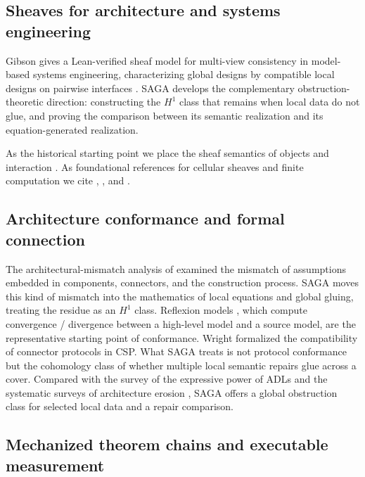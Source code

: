 \subsection{Sheaves for architecture and systems engineering}\label{sec:82}

Gibson gives a Lean-verified sheaf model for multi-view consistency in
model-based systems engineering, characterizing global designs by
compatible local designs on pairwise interfaces
\citep{gibson2026sheaves}. SAGA develops the complementary
obstruction-theoretic direction: constructing the $H^1$ class that
remains when local data do not glue, and proving the comparison
between its semantic realization and its equation-generated
realization.

As the historical starting point we place the sheaf semantics of
objects and interaction \citep{goguen1992sheaf}. As foundational
references for cellular sheaves and finite computation we cite
\citet{curry2014sheaves}, \citet{robinson2017sheaves}, and
\citet{hansen2019spectral}.

\subsection{Architecture conformance and formal connection}\label{sec:83}

The architectural-mismatch analysis of \citet{garlan1995architectural}
examined the mismatch of assumptions embedded in components,
connectors, and the construction process. SAGA moves this kind of
mismatch into the mathematics of local equations and global gluing,
treating the residue as an $H^1$ class. Reflexion models \citep{murphy1995reflexion}, which
compute convergence / divergence between a high-level model and a
source model, are the representative starting point of conformance.
Wright \citep{allen1997formal} formalized the compatibility of
connector protocols in CSP. What SAGA treats is not protocol
conformance but the cohomology class of whether multiple local
semantic repairs glue across a cover. Compared with the survey of the
expressive power of ADLs \citep{medvidovic2000classification} and the
systematic surveys of architecture erosion
\citep{desilva2012controlling, li2022understanding}, SAGA offers a
global obstruction class for selected local data and a repair
comparison.

\subsection{Mechanized theorem chains and executable measurement}\label{sec:84}

